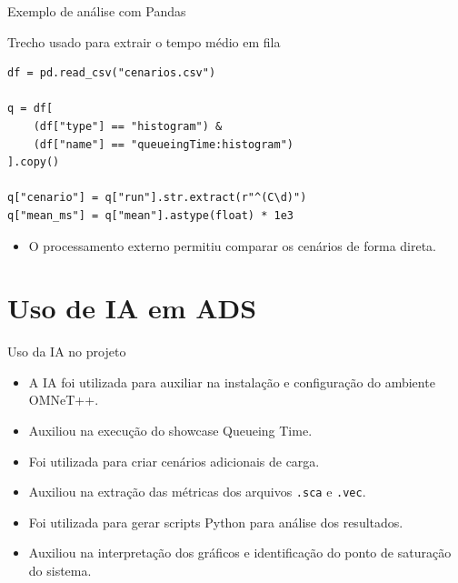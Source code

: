 \documentclass[aspectratio=169]{beamer}
\begin{document}
\begin{frame}[fragile]{Exemplo de análise com Pandas}
\begin{block}{Trecho usado para extrair o tempo médio em fila}
\begin{verbatim}
df = pd.read_csv("cenarios.csv")

q = df[
    (df["type"] == "histogram") &
    (df["name"] == "queueingTime:histogram")
].copy()

q["cenario"] = q["run"].str.extract(r"^(C\d)")
q["mean_ms"] = q["mean"].astype(float) * 1e3
\end{verbatim}
\end{block}

\begin{itemize}
    \item O processamento externo permitiu comparar os cenários de forma direta.
\end{itemize}
\end{frame}

\section{Uso de IA em ADS}

\begin{frame}{Uso da IA no projeto}
\begin{itemize}
    \item A IA foi utilizada para auxiliar na instalação e configuração do ambiente OMNeT++.
    \item Auxiliou na execução do showcase Queueing Time.
    \item Foi utilizada para criar cenários adicionais de carga.
    \item Auxiliou na extração das métricas dos arquivos \texttt{.sca} e \texttt{.vec}.
    \item Foi utilizada para gerar scripts Python para análise dos resultados.
    \item Auxiliou na interpretação dos gráficos e identificação do ponto de saturação do sistema.
\end{itemize}
\end{frame}
\end{document}
